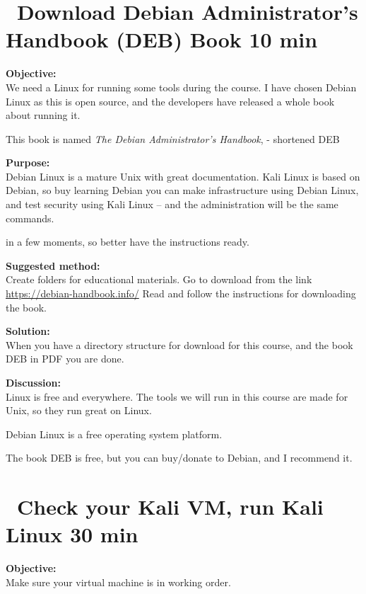 \documentclass[a4paper,11pt,notitlepage]{report}
\begin{document}
\chapter{\faInfoCircle\ Download Debian Administrator’s Handbook (DEB) Book 10 min}
\label{ex:sw-downloadDEB}



{\bf Objective:}\\
We need a Linux for running some tools during the course. I have chosen Debian Linux as this is open source, and the developers have released a whole book about running it.

This book is named
\emph{The Debian Administrator’s Handbook},  - shortened DEB

{\bf Purpose:}\\
Debian Linux is a mature Unix with great documentation. Kali Linux is based on Debian, so buy learning Debian you can make infrastructure using Debian Linux, and test security using Kali Linux -- and the administration will be the same commands.

in a few moments, so better have the instructions ready.

{\bf Suggested method:}\\
Create folders for educational materials. Go to download from the link \url{https://debian-handbook.info/}
Read and follow the instructions for downloading the book.

{\bf Solution:}\\
When you have a directory structure for download for this course, and the book DEB in PDF you are done.

{\bf Discussion:}\\
Linux is free and everywhere. The tools we will run in this course are made for Unix, so they run great on Linux.

Debian Linux is a free operating system platform.

The book DEB is free, but you can buy/donate to Debian, and I recommend it.


\chapter{\faExclamationTriangle\ Check your Kali VM, run Kali Linux 30 min}
\label{ex:basicKaliVM}


{\bf Objective:}\\
Make sure your virtual machine is in working order.
\end{document}
